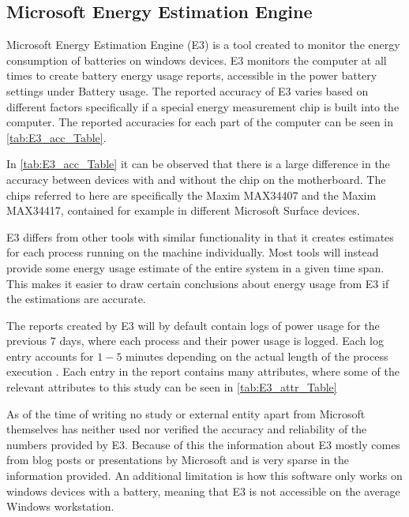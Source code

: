 \subsection{Microsoft Energy Estimation Engine}
Microsoft Energy Estimation Engine (E3) is a tool created to monitor the energy consumption of batteries on windows devices. E3 monitors the computer at all times to create battery energy usage reports, accessible in the power battery settings under Battery usage.\cite[p.43]{E3WinHec}
The reported accuracy of E3 varies based on different factors specifically if a special energy measurement chip is built into the computer. The reported accuracies for each part of the computer can be seen in \cref{tab:E3_acc_Table}. 



In \cref*{tab:E3_acc_Table} it can be observed that there is a large difference in the accuracy between devices with and without the chip on the motherboard. The chips referred to here are specifically the Maxim MAX34407 and the Maxim MAX34417, contained for example in different Microsoft Surface devices.


E3 differs from other tools with similar functionality in that it creates estimates for each process running on the machine individually. Most tools will instead provide some energy usage estimate of the entire system in a given time span. This makes it easier to draw certain conclusions about energy usage from E3 if the estimations are accurate. 

The reports created by E3 will by default contain logs of power usage for the previous $7$ days, where each process and their power usage is logged. Each log entry accounts for $1-5$ minutes depending on the actual length of the process execution \cite[]{E3Video}. Each entry in the report contains many attributes, where some of the relevant attributes to this study can be seen in \cref{tab:E3_attr_Table}



As of the time of writing no study or external entity apart from Microsoft themselves has neither used nor verified the accuracy and reliability of the numbers provided by E3. Because of this the information about E3 mostly comes from blog posts or presentations by Microsoft and is very sparse in the information provided. An additional limitation is how this software only works on windows devices with a battery, meaning that E3 is not accessible on the average Windows workstation.

